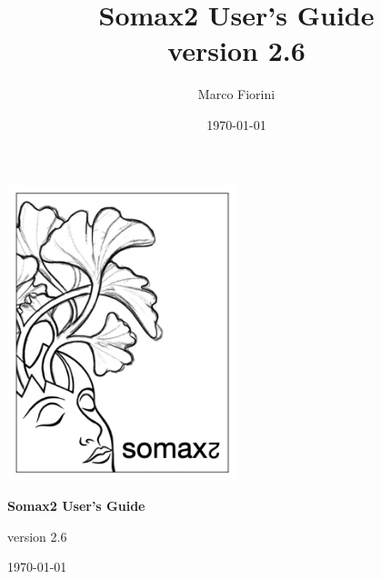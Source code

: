 \documentclass[11pt, a4paper]{report}
\title{Somax2 User's Guide\\[0.24cm]
	\large{version 2.6}}
\author{Marco Fiorini}
\date{\today}
\begin{document}
\begin{titlepage}
	\centering

\includegraphics[width=0.5\textwidth]{img/somax_logo.png}\par\vspace{1cm}

{\huge\bfseries Somax2 User's Guide\par}
\vspace{20pt}
{\large{version 2.6}}

\vfill

{\large \today\par}
\end{titlepage}


\tableofcontents







\end{document}
